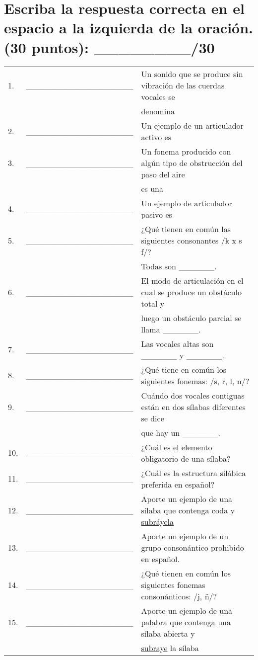 \documentclass[12pt]{exam}
\begin{document}
\section{Escriba la respuesta correcta en el espacio a la izquierda de la oración. (30 puntos): \_\_\_\_\_\_\_\_/30}

\renewcommand{\arraystretch}{1.75}
	\begin{tabular}{@{}llp{2cm}@{}}
	 1.  & \_\_\_\_\_\_\_\_\_\_\_\_\_\_\_\_\_\_ & Un sonido que se produce sin vibración de las cuerdas vocales se \\&& denomina        \\
	 2.  & \_\_\_\_\_\_\_\_\_\_\_\_\_\_\_\_\_\_ & Un ejemplo de un articulador activo es                                           \\
	 3.  & \_\_\_\_\_\_\_\_\_\_\_\_\_\_\_\_\_\_ & Un fonema producido con algún tipo de obstrucción del paso del aire \\&& es una       \\
	 4.  & \_\_\_\_\_\_\_\_\_\_\_\_\_\_\_\_\_\_ & Un ejemplo de articulador pasivo es \\
	 5.  & \_\_\_\_\_\_\_\_\_\_\_\_\_\_\_\_\_\_ & ¿Qué tienen en común las siguientes consonantes /k x s f/? \\&& Todas son \_\_\_\_\_\_.\\
	 6.  & \_\_\_\_\_\_\_\_\_\_\_\_\_\_\_\_\_\_ & El modo de articulación en el cual se produce un obstáculo total y \\&& luego un obstáculo parcial se llama \_\_\_\_\_\_.\\
	 7. & \_\_\_\_\_\_\_\_\_\_\_\_\_\_\_\_\_\_ & Las vocales altas son \_\_\_\_\_\_ y \_\_\_\_\_\_.\\
	 8. & \_\_\_\_\_\_\_\_\_\_\_\_\_\_\_\_\_\_ & ¿Qué tiene en común los siguientes fonemas: /s, r, l, n/?\\
	 9. & \_\_\_\_\_\_\_\_\_\_\_\_\_\_\_\_\_\_ & Cuándo dos vocales contiguas están en dos sílabas diferentes se dice \\&& que hay un \_\_\_\_\_\_.\\
	 10. & \_\_\_\_\_\_\_\_\_\_\_\_\_\_\_\_\_\_ & ¿Cuál es el elemento obligatorio de una sílaba?\\
	 11. & \_\_\_\_\_\_\_\_\_\_\_\_\_\_\_\_\_\_ & ¿Cuál es la estructura silábica preferida en español?\\
	 12. & \_\_\_\_\_\_\_\_\_\_\_\_\_\_\_\_\_\_ & Aporte un ejemplo de una sílaba que contenga coda y \underline{subráyela} \\
	 13. & \_\_\_\_\_\_\_\_\_\_\_\_\_\_\_\_\_\_ & Aporte un ejemplo de un grupo consonántico prohibido en español. \\
	 14. & \_\_\_\_\_\_\_\_\_\_\_\_\_\_\_\_\_\_ & ¿Qué tienen en común los siguientes fonemas consonánticos: /j, ñ/? \\
	 15. & \_\_\_\_\_\_\_\_\_\_\_\_\_\_\_\_\_\_ & Aporte un ejemplo de una palabra que contenga una sílaba abierta y \\&& \underline{subraye} la sílaba\\
	\end{tabular}
\end{document}
